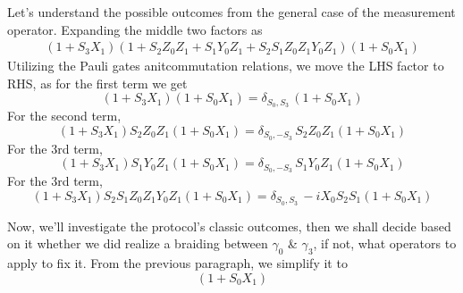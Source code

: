 \documentclass{article}
\begin{document}
\vspace{12pt}
Let's understand the possible outcomes from the general case of the measurement operator. Expanding the middle two factors as
$$
	\begin{aligned}
		(1 +S_3 X_1) (1 + S_2 Z_0 Z_1 + S_1 Y_0 Z_1 + S_2 S_1 Z_0 Z_1 Y_0 Z_1) (1 +S_0 X_1)
		\label{eq:expanding}
	\end{aligned}
$$
Utilizing the Pauli gates anitcommutation relations, we move the LHS factor to RHS,
as for the first term we get
\begin{equation*}
	(1 +S_3 X_1) (1 +S_0 X_1) = \delta_{S_0,S_3}\, (1 +S_0 X_1)
\end{equation*}
For the second term,
\begin{equation*}
	(1 +S_3 X_1) S_2 Z_0 Z_1 (1 +S_0 X_1) = \delta_{S_0,-S_3}\, S_2 Z_0 Z_1 (1 +S_0 X_1)
\end{equation*}
For the 3rd term,
\begin{equation*}
	(1 +S_3 X_1) S_1 Y_0 Z_1 (1 +S_0 X_1) = \delta_{S_0,-S_3}\, S_1 Y_0 Z_1 (1 +S_0 X_1)
\end{equation*}
For the 3rd term,
\begin{equation*}
	(1 +S_3 X_1) S_2 S_1 Z_0 Z_1 Y_0 Z_1 (1 +S_0 X_1) = \delta_{S_0,S_3}\, -i X_0 S_2 S_1 (1 +S_0 X_1)
\end{equation*}

Now, we'll investigate the protocol's classic outcomes, then we shall decide based on it whether
we did realize a braiding between $ \gamma_0 $ \& $ \gamma_3 $, if not, what operators
to apply to fix it. From the previous paragraph, we simplify it to
\begin{equation*}
	[
		\delta_{S_0,S_3} + \delta_{S_0,-S_3}\, S_2 Z_0 Z_1
		+ \delta_{S_0,-S_3}\, S_1 Y_0 Z_1 + \delta_{S_0,S_3}\, -i X_0 S_2 S_1
	] (1 +S_0 X_1)
\end{equation*}
\end{document}
